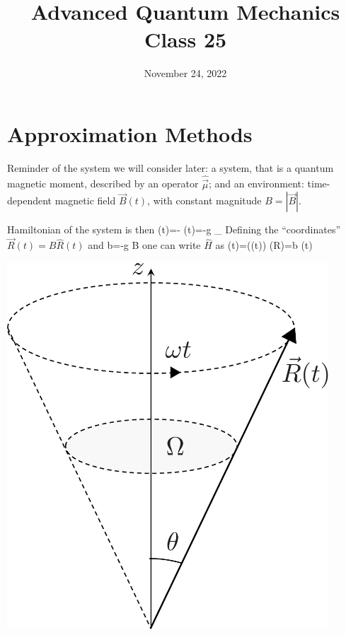 \documentclass[12pt]{article}
\title{Advanced Quantum Mechanics\\Class 25}
\date{November 24, 2022}                                           %
\begin{document}
\maketitle

\setcounter{section}{6}

\section{Approximation Methods}

Reminder of the system we will consider later:
a system, that is a quantum magnetic moment,
 described by an operator $\hat{\vec{\mu}}$;
and an environment: time-dependent magnetic field
$\vec{B}(t)$, with constant magnitude $B=|\vec{B}|$.

\begin{minipage}{0.6\textwidth}
\setcounter{equation}{77}
Hamiltonian of the system is then
\be
{}(t)=-\hat{\vec{\mu}} \cdot {}(t)=-g _{}  \cdot {}
\ee	
Defining the ``coordinates'' $\vec{R}(t)=B \hat{R}(t)$ and
\be
b=-g  B
\ee
one can write $\hat{H}$ as
\be
{}(t)=((t)) \equiv {}(R)=b (t) \cdot {}
\label{eq:g80}
\ee
\end{minipage}%
\begin{minipage}{0.4\textwidth}
\hfill\includegraphics[width=0.9\textwidth]{Figures/RotatingVector-crop.pdf}
\end{minipage}
\end{document}
